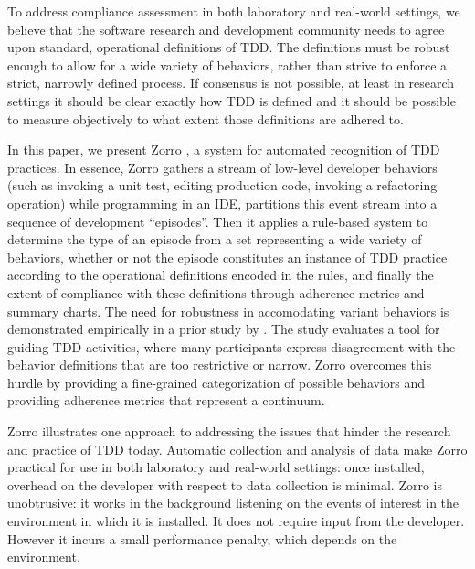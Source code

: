 \documentclass[smallextended]{svjour3}     %
\begin{document}
To address  compliance assessment in both laboratory and
real-world settings, we believe that the software research and
development community needs to agree upon 
standard, operational definitions of TDD. The definitions must be robust 
enough to allow for a wide variety of behaviors, rather 
than strive to enforce a strict, narrowly defined  process. If consensus is not possible,
at least in research settings it should be clear exactly how TDD is defined and  
it should 
be possible to 
measure objectively to what extent those definitions are adhered to. 


In this paper, we present Zorro  \citep{csdl2-07-04}, a system for automated recognition of TDD
practices.  In essence, Zorro gathers a stream of low-level developer
behaviors (such as invoking a unit test, editing production code, invoking
a refactoring operation) while programming in an IDE, partitions this event
stream into a sequence of development ``episodes''.  Then it applies a
rule-based system to determine the type of an episode from a set
representing a wide variety of behaviors, whether or not the episode
constitutes an instance of TDD practice according to the operational
definitions encoded in the rules, and finally the extent of compliance with
these definitions through adherence metrics and summary charts.  The need
for robustness in accomodating variant behaviors is demonstrated
empirically in a prior study by \cite{Mishali:08}. The study evaluates a
tool for guiding TDD activities, where many participants express
disagreement with the behavior definitions that are too restrictive or
narrow. Zorro overcomes this hurdle by providing a fine-grained
categorization of possible behaviors and providing adherence metrics that
represent a continuum.

Zorro illustrates one approach to addressing the issues 
that hinder the research and practice of TDD today.  Automatic collection
and analysis of data make Zorro practical for use in both laboratory and
real-world settings: once installed, overhead on the developer
with respect to data collection is minimal. Zorro is unobtrusive:  
it works in the background listening on the events of interest in the environment 
in which it is installed. It does not require input from the developer. 
However it incurs a small performance penalty, which depends on the environment. 
\end{document}
